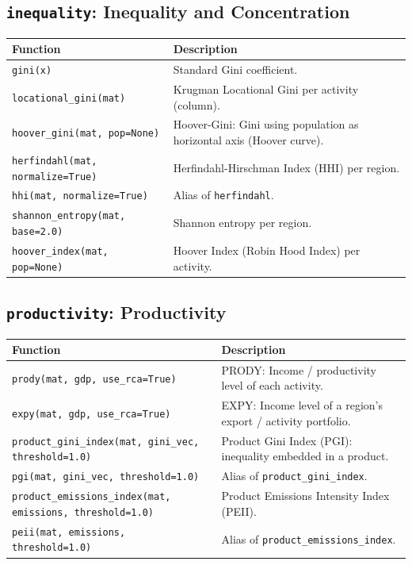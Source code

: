 \subsection{\texttt{inequality}: Inequality and Concentration}
\begin{longtable}{>{\raggedright\arraybackslash}p{9.2cm} >{\raggedright\arraybackslash}p{7.0cm}}
\toprule
\textbf{Function} & \textbf{Description} \\
\midrule\endhead
\texttt{\footnotesize gini(x)} & {\small Standard Gini coefficient.} \\[2pt]
\texttt{\footnotesize locational\_gini(mat)} & {\small Krugman Locational Gini per activity (column).} \\[2pt]
\texttt{\footnotesize hoover\_gini(mat, pop=None)} & {\small Hoover-Gini: Gini using population as horizontal axis (Hoover curve).} \\[2pt]
\texttt{\footnotesize herfindahl(mat, normalize=True)} & {\small Herfindahl-Hirschman Index (HHI) per region.} \\[2pt]
\texttt{\footnotesize hhi(mat, normalize=True)} & {\small Alias of \texttt{herfindahl}.} \\[2pt]
\texttt{\footnotesize shannon\_entropy(mat, base=2.0)} & {\small Shannon entropy per region.} \\[2pt]
\texttt{\footnotesize hoover\_index(mat, pop=None)} & {\small Hoover Index (Robin Hood Index) per activity.} \\[2pt]
\bottomrule
\end{longtable}

\subsection{\texttt{productivity}: Productivity}
\begin{longtable}{>{\raggedright\arraybackslash}p{9.2cm} >{\raggedright\arraybackslash}p{7.0cm}}
\toprule
\textbf{Function} & \textbf{Description} \\
\midrule\endhead
\texttt{\footnotesize prody(mat, gdp, use\_rca=True)} & {\small PRODY: Income / productivity level of each activity.} \\[2pt]
\texttt{\footnotesize expy(mat, gdp, use\_rca=True)} & {\small EXPY: Income level of a region's export / activity portfolio.} \\[2pt]
\texttt{\footnotesize product\_gini\_index(mat, gini\_vec, threshold=1.0)} & {\small Product Gini Index (PGI): inequality embedded in a product.} \\[2pt]
\texttt{\footnotesize pgi(mat, gini\_vec, threshold=1.0)} & {\small Alias of \texttt{product\_gini\_index}.} \\[2pt]
\texttt{\footnotesize product\_emissions\_index(mat, emissions, threshold=1.0)} & {\small Product Emissions Intensity Index (PEII).} \\[2pt]
\texttt{\footnotesize peii(mat, emissions, threshold=1.0)} & {\small Alias of \texttt{product\_emissions\_index}.} \\[2pt]
\bottomrule
\end{longtable}


